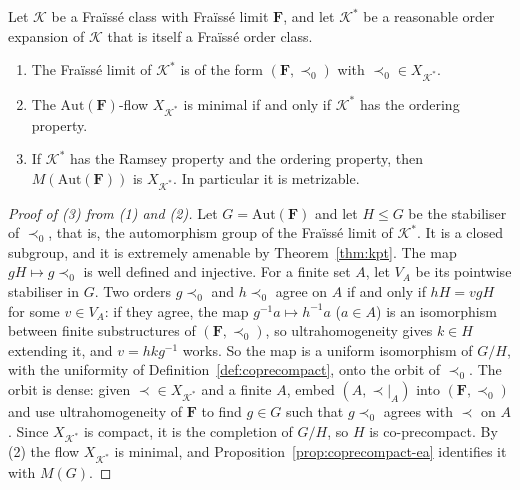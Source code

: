 \begin{theorem}\label{thm:kpt-umf}
Let $\mathcal{K}$ be a Fraïssé class with Fraïssé limit $\mathbf{F}$, and let
$\mathcal{K}^*$ be a reasonable order expansion of $\mathcal{K}$ that is itself
a Fraïssé order class.
\begin{enumerate}
\item The Fraïssé limit of $\mathcal{K}^*$ is of the form
  $(\mathbf{F},\prec_0)$ with $\prec_0\in X_{\mathcal{K}^*}$.
\item The $\mathrm{Aut}(\mathbf{F})$-flow $X_{\mathcal{K}^*}$ is minimal if
  and only if $\mathcal{K}^*$ has the ordering property.
\item If $\mathcal{K}^*$ has the Ramsey property and the ordering property,
  then $M(\mathrm{Aut}(\mathbf{F}))$ is $X_{\mathcal{K}^*}$. In particular it
  is metrizable.
\end{enumerate}
\end{theorem}

\begin{proof}[Proof of (3) from (1) and (2)]
Let $G=\mathrm{Aut}(\mathbf{F})$ and let $H\leq G$ be the stabiliser of
$\prec_0$, that is, the automorphism group of the Fraïssé limit of
$\mathcal{K}^*$. It is a closed subgroup, and it is extremely amenable by
Theorem~\ref{thm:kpt}. The map $gH\mapsto g{\prec_0}$ is well defined and
injective. For a finite set $A$, let $V_A$ be its pointwise stabiliser in $G$.
Two orders $g{\prec_0}$ and $h{\prec_0}$ agree on $A$ if and only if
$hH=vgH$ for some $v\in V_A$: if they agree, the map $g^{-1}a\mapsto h^{-1}a$
($a\in A$) is an isomorphism between finite substructures of
$(\mathbf{F},\prec_0)$, so ultrahomogeneity gives $k\in H$ extending it, and
$v=hkg^{-1}$ works. So the map is a uniform isomorphism of $G/H$,
with the uniformity of Definition~\ref{def:coprecompact}, onto the orbit of
$\prec_0$. The orbit is dense: given $\prec\in X_{\mathcal{K}^*}$ and a
finite $A$, embed $(A,{\prec}|_A)$ into $(\mathbf{F},\prec_0)$ and use
ultrahomogeneity of $\mathbf{F}$ to find $g\in G$ such that $g{\prec_0}$
agrees with $\prec$ on $A$. Since $X_{\mathcal{K}^*}$ is compact, it is the
completion of $G/H$, so $H$ is co-precompact. By (2) the flow
$X_{\mathcal{K}^*}$ is minimal, and Proposition~\ref{prop:coprecompact-ea}
identifies it with $M(G)$.
\end{proof}

